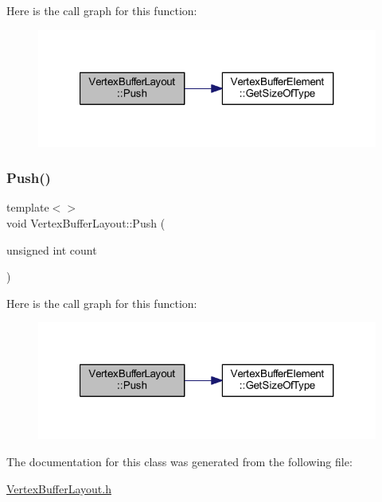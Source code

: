 Here is the call graph for this function\+:
\nopagebreak
\begin{figure}[H]
\begin{center}
\leavevmode
\includegraphics[width=321pt]{class_vertex_buffer_layout_a0ac1e4373209bf1a2c5c3551f690724b_cgraph}
\end{center}
\end{figure}
\mbox{\label{class_vertex_buffer_layout_a0ac1e4373209bf1a2c5c3551f690724b}} 
\subsubsection{\texorpdfstring{Push()}{Push()}\hspace{0.1cm}{\footnotesize\ttfamily [4/4]}}
{\footnotesize\ttfamily template$<$$>$ \\
void Vertex\+Buffer\+Layout\+::\+Push (\begin{DoxyParamCaption}\item[{unsigned int}]{count }\end{DoxyParamCaption})\hspace{0.3cm}{\ttfamily [inline]}}

Here is the call graph for this function\+:
\nopagebreak
\begin{figure}[H]
\begin{center}
\leavevmode
\includegraphics[width=321pt]{class_vertex_buffer_layout_a0ac1e4373209bf1a2c5c3551f690724b_cgraph}
\end{center}
\end{figure}


The documentation for this class was generated from the following file\+:\begin{DoxyCompactItemize}
\item 
\mbox{\hyperlink{_vertex_buffer_layout_8h}{Vertex\+Buffer\+Layout.\+h}}\end{DoxyCompactItemize}
